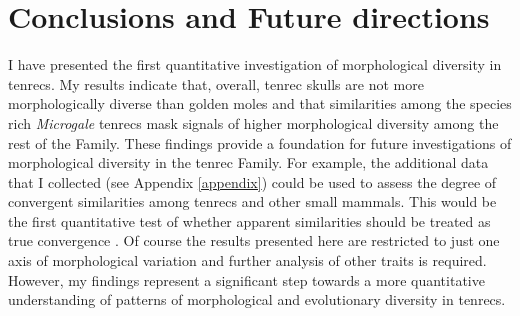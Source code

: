 \section{Conclusions and Future directions}
\label{sect:concl}

	I have presented the first quantitative investigation of morphological diversity in tenrecs. My results indicate that, overall, tenrec skulls are not more morphologically diverse than golden moles and that similarities among the species rich \textit{Microgale} tenrecs mask signals of higher morphological diversity among the rest of the Family. These findings provide a foundation for future investigations of morphological diversity in the tenrec Family. For example, the additional data that I collected (see Appendix \ref{appendix}) could be used to assess the degree of convergent similarities among tenrecs and other small mammals. This would be the first quantitative test of whether apparent similarities \citep{Olson2013, Soarimalala2011, Eisenberg1969} should be treated as true convergence \citep[e.g.][]{Losos2011, Stayton2008}.
	Of course the results presented here are restricted to just one axis of morphological variation and further analysis of other traits is required. However, my findings represent a significant step towards a more quantitative understanding of patterns of morphological and evolutionary diversity in tenrecs. 








